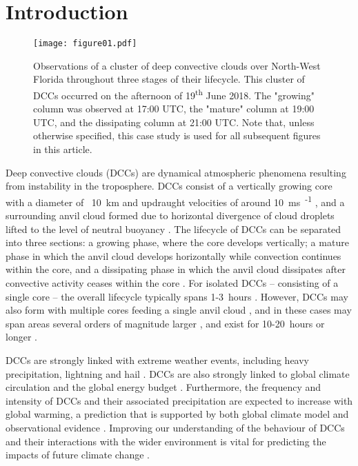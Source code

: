 
\section{Introduction} %

\begin{figure*}[t]
    \texttt{[image: figure01.pdf]}
    \caption{Observations of a cluster of deep convective clouds over North-West Florida throughout three stages of their lifecycle. This cluster of DCCs occurred on the afternoon of 19\textsuperscript{th} June 2018. The "growing" column was observed at 17:00 UTC, the "mature" column at 19:00 UTC, and the dissipating column at 21:00 UTC. Note that, unless otherwise specified, this case study is used for all subsequent figures in this article.}
    \label{fig:compare_sat_radar_glm}
\end{figure*}


Deep convective clouds (DCCs) are dynamical atmospheric phenomena resulting from instability in the troposphere.
DCCs consist of a vertically growing core with a diameter of ~10~\unit{km} and updraught velocities of around 10~\unit{ms\textsuperscript{-1}} \citep{weisman_mesoscale_2015}, and a surrounding anvil cloud formed due to horizontal divergence of cloud droplets lifted to the level of neutral buoyancy \citep{houze_chapter_2014}.
The lifecycle of DCCs can be separated into three sections: a growing phase, where the core develops vertically; a mature phase in which the anvil cloud develops horizontally while convection continues within the core, and a dissipating phase in which the anvil cloud dissipates after convective activity ceases within the core \citep{wall_life_2018}.
For isolated DCCs -- consisting of a single core -- the overall lifecycle typically spans 1-3~hours \citep{chen_diurnal_1997}.
However, DCCs may also form with multiple cores feeding a single anvil cloud \citep{roca_simple_2017}, and in these cases may span areas several orders of magnitude larger \citep{houze_mesoscale_2004}, and exist for 10-20~hours or longer \citep{chen_diurnal_1997}.

DCCs are strongly linked with extreme weather events, including heavy precipitation, lightning and hail \citep{westra_future_2014, houze_chapter_2014, williams_radar_1992, bruning_theory_2013, punge_hail_2016, matsudo_severe_2011}. 
DCCs are also strongly linked to global climate circulation and the global energy budget \citep{houze_mesoscale_2004, fritsch_mesoscale_2001, johnson_mesoscale_2001}.
Furthermore, the frequency and intensity of DCCs and their associated precipitation are expected to increase with global warming, a prediction that is supported by both global climate model \citep{allen_constraints_2002, trenberth_changing_2003, held_robust_2006, muller_energetic_2011, ogorman_energetic_2012, ogorman_precipitation_2015} and observational evidence \citep{tan_increases_2015, berg_strong_2013, aumann_increased_2018, houze_extreme_2019}.
Improving our understanding of the behaviour of DCCs and their interactions with the wider environment is vital for predicting the impacts of future climate change \citep{westra_future_2014}.

